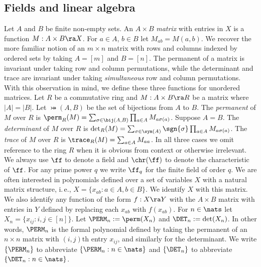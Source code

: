 \documentclass[11pt]{article}
\newcommand{\ie}{i.\,e.}
\begin{document}
\subsection{Fields and linear algebra}
Let $A$ and $B$ be finite non-empty sets. An $A\times B$ \emph{matrix}
with entries in $X$ is a function $M : A \times B \ra X$. For $a \in A$, $b \in
B$ let $M_{ab} = M(a, b)$. We recover the more familiar notion of an $m \times
n$ matrix with rows and columns indexed by ordered sets by taking $A = [m]$ and
$B = [n]$.
The permanent of a matrix is invariant under taking row and column permutations,
while the determinant and trace are invariant under taking \emph{simultaneous}
row and column permutations.  With this observation in mind, we define these
three functions for unordered matrices.  Let $R$ be a commutative ring and $M : A
\times B \ra R$ be a matrix where $ \vert A \vert = \vert B \vert$. Let $\bij(A,
B)$ be the set of bijections from $A$ to $B$. The \emph{permanent} of $M$ over
$R$ is $\perm_R(M) = \sum_{\sigma \in \bij(A, B)}\prod_{a \in A} M_{a
  \sigma(a)}$.  Suppose $A = B$.  The \emph{determinant} of $M$ over $R$ is
$\det_R (M) = \sum_{\sigma \in \sym(A)}\sgn{\sigma}\prod_{a \in A} M_{a
  \sigma(a)}$.  The \emph{trace} of $M$ over $R$ is $\trace_R(M) = \sum_{a \in A}
M_{a a}$.  In all three cases we omit reference to the ring $R$ when it is
obvious from context or otherwise irrelevant.
We always use $\ff$ to denote a field and $\chr(\ff)$ to denote the
characteristic of $\ff$.  For any prime power $q$ we write $\ff_q$ for the
finite field of order $q$.  We are often interested in polynomials defined over a
set of variables $X$ with a natural matrix structure, \ie, $X = \{x_{ab} : a
\in A, b \in B\}$.  We identify $X$ with this matrix.  We also identify any
function of the form $f : X \ra Y$ with the $A \times B$ matrix with entries in
$Y$ defined by replacing each $x_{ab}$ with $f(x_{ab})$.
For $n \in \nats$ let $X_n = \{x_{ij} : i, j \in [n]\}$.  Let $\PERM_n :=
\perm(X_n)$ and $\DET_n := \det(X_n)$.  In other words, $\PERM_n$
is the formal polynomial defined by taking the permanent
of an $n \times n$ matrix with $(i, j)$th entry $x_{i j}$, and
similarly for the determinant.
We write $\{\PERM_n\}$ to abbreviate $\{\PERM_n : n \in \nats\}$ and $\{\DET_n\}$
to abbreviate $\{\DET_n : n \in \nats\}$.
\end{document}
